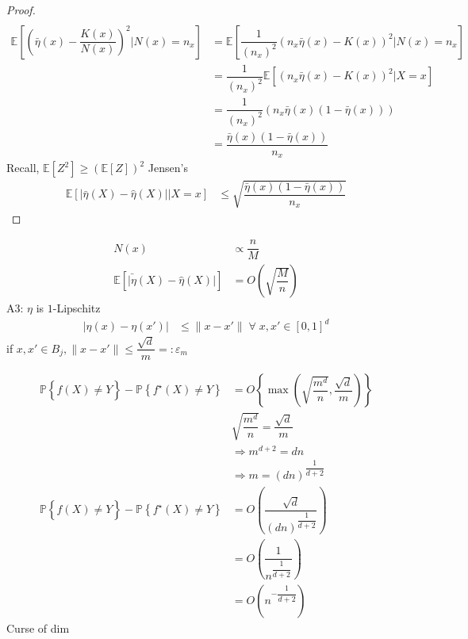 \documentclass{article}
\begin{document}
\begin{proof}
\begin{align*}
\\ \mathbb{E}\left[\left(\bar{\eta}\left(x\right) - \dfrac{K\left(x\right)}{N\left(x\right)}\right)^{2} | N\left(x\right) = n_{x}\right] &= \mathbb{E}\left[\dfrac{1}{\left(n_{x}\right)^{2}} \left(n_{x} \bar{\eta}\left(x\right) - K\left(x\right)\right)^{2} | N\left(x\right) = n_{x}\right]
\\ &= \dfrac{1}{\left(n_{x}\right)^{2}} \mathbb{E}\left[\left(n_{x} \bar{\eta}\left(x\right) - K\left(x\right)\right)^{2} | X = x \right]
\\ &= \dfrac{1}{\left(n_{x}\right)^{2}} \left(n_{x} \bar{\eta}\left(x\right) \left(1 - \bar{\eta}\left(x\right)\right)\right)
\\ &= \dfrac{\bar{\eta}\left(x\right) \left(1 - \bar{\eta}\left(x\right)\right)}{n_{x}}
\end{align*}
Recall, $\mathbb{E}\left[Z^{2}\right] \geq  \left(\mathbb{E}\left[Z\right]\right)^{2}$ Jensen's
\begin{align*}
\mathbb{E}\left[| \bar{\eta}\left(X\right) - \hat{\eta}\left(X\right) | | X = x\right] &\leq  \sqrt{\dfrac{\bar{\eta}\left(x\right) \left(1 - \bar{\eta}\left(x\right)\right)}{n_{x}}}
\end{align*}\end{proof}
\begin{align*}
N\left(x\right)  &\propto \dfrac{n}{M}
\\ \mathbb{E}\left[\bar{|\eta}\left(X\right) - \hat{\eta}\left(X\right)|\right] &= O\left(\sqrt{\dfrac{M}{n}}\right)
\end{align*}
A3: $\eta$ is $1$-Lipschitz
\begin{align*}
| \eta\left(x\right) - \eta\left(x'\right) | &\leq  \| x - x' \| \;\forall\; x, x' \in \left[0, 1\right]^{d}
\end{align*}
if $x , x' \in B_{j}, \| x - x' \| \leq  \dfrac{\sqrt{d}}{m} =: \varepsilon_{m}$

\begin{align*}
\mathbb{P}\left\{\hat{f}\left(X\right) \neq  Y\right\} - \mathbb{P}\left\{f^\star \left(X\right) \neq  Y\right\} &= O\left\{\displaystyle\max\left(\sqrt{\dfrac{m^{d}}{n}}, \dfrac{\sqrt{d}}{m}\right)\right\}
\\ &  \sqrt{\dfrac{m^{d}}{n}} = \dfrac{\sqrt{d}}{m}
\\ &\Rightarrow  m^{d+2} = d n 
\\ &\Rightarrow  m = \left(d n\right)^{\dfrac{1}{d+2}}
\\ \mathbb{P}\left\{\hat{f}\left(X\right) \neq  Y\right\} - \mathbb{P}\left\{f^\star \left(X\right) \neq  Y\right\} &= O\left( \dfrac{\sqrt{d}}{\left(d n\right)^{\dfrac{1}{d+2}}}\right)
\\ &= O\left(\dfrac{1}{n^{\dfrac{1}{d+2}}}\right)
\\ &= O\left(n^{- \dfrac{1}{d+2}}\right)
\end{align*}
Curse of dim
\end{document}
